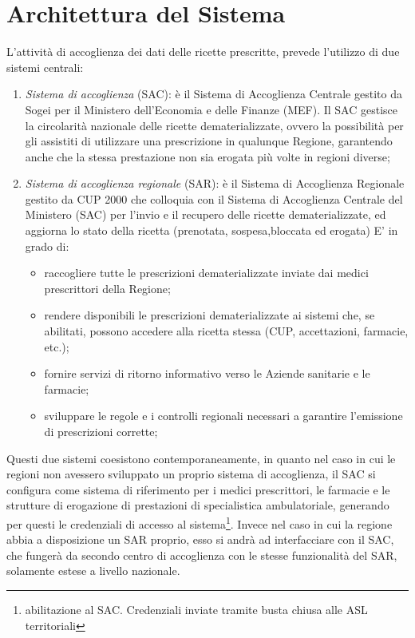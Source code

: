 \section{Architettura del Sistema}
%
L'attività di accoglienza dei dati delle ricette prescritte, prevede l'utilizzo di due sistemi centrali:
\begin{enumerate}
	\item \emph{Sistema di accoglienza} (SAC): è il Sistema di Accoglienza Centrale gestito da Sogei per il Ministero dell'Economia e delle Finanze (MEF). Il SAC gestisce la circolarità nazionale delle ricette dematerializzate, ovvero la possibilità per gli assistiti di utilizzare una prescrizione in qualunque Regione, garantendo anche che la stessa prestazione non sia erogata più volte in regioni diverse;
	\item \emph{Sistema di accoglienza regionale} (SAR): è il Sistema di Accoglienza Regionale gestito da CUP 2000 che colloquia con il Sistema di Accoglienza Centrale del Ministero (SAC) per l’invio e il recupero delle ricette dematerializzate, ed aggiorna lo stato della ricetta (prenotata, sospesa,bloccata ed erogata) E' in grado di: \begin{itemize}
	\item raccogliere tutte le prescrizioni dematerializzate inviate dai medici prescrittori della Regione;
	\item rendere disponibili le prescrizioni dematerializzate ai sistemi che, se abilitati, possono accedere alla ricetta stessa (CUP, accettazioni, farmacie, etc.);
	\item fornire servizi di ritorno informativo verso le Aziende sanitarie e le farmacie;
	\item sviluppare le regole e i controlli regionali necessari a garantire l’emissione di prescrizioni corrette;
	\end{itemize}
\end{enumerate}
Questi due sistemi coesistono contemporaneamente, in quanto nel caso in cui le regioni non avessero sviluppato un proprio sistema di accoglienza, il SAC si configura come sistema di riferimento per i medici prescrittori, le farmacie e le strutture di erogazione di prestazioni di specialistica ambulatoriale, generando per questi le credenziali di accesso al sistema\footnote{abilitazione al SAC. Credenziali inviate tramite busta chiusa alle ASL territoriali}. Invece nel caso in cui la regione abbia a disposizione un SAR proprio, esso si andrà ad interfacciare con il SAC, che fungerà da secondo centro di accoglienza con le stesse funzionalità del SAR, solamente estese a livello nazionale.
%
